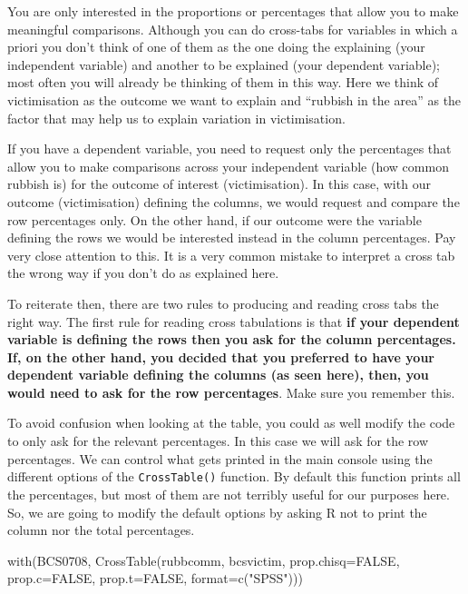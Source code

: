 \documentclass[
]{book}
\newenvironment{Shaded}{\begin{snugshade}}{\end{snugshade}}
\newcommand{\AttributeTok}[1]{\textcolor[rgb]{0.77,0.63,0.00}{#1}}
\newcommand{\ConstantTok}[1]{\textcolor[rgb]{0.00,0.00,0.00}{#1}}
\newcommand{\FunctionTok}[1]{\textcolor[rgb]{0.00,0.00,0.00}{#1}}
\newcommand{\NormalTok}[1]{#1}
\newcommand{\StringTok}[1]{\textcolor[rgb]{0.31,0.60,0.02}{#1}}
\begin{document}
You are only interested in the proportions or percentages that allow you to make meaningful comparisons. Although you can do cross-tabs for variables in which a priori you don't think of one of them as the one doing the explaining (your independent variable) and another to be explained (your dependent variable); most often you will already be thinking of them in this way. Here we think of victimisation as the outcome we want to explain and ``rubbish in the area'' as the factor that may help us to explain variation in victimisation.

If you have a dependent variable, you need to request only the percentages that allow you to make comparisons across your independent variable (how common rubbish is) for the outcome of interest (victimisation). In this case, with our outcome (victimisation) defining the columns, we would request and compare the row percentages only. On the other hand, if our outcome were the variable defining the rows we would be interested instead in the column percentages. Pay very close attention to this. It is a very common mistake to interpret a cross tab the wrong way if you don't do as explained here.

To reiterate then, there are two rules to producing and reading cross tabs the right way. The first rule for reading cross tabulations is that \textbf{if your dependent variable is defining the rows then you ask for the column percentages. If, on the other hand, you decided that you preferred to have your dependent variable defining the columns (as seen here), then, you would need to ask for the row percentages}. Make sure you remember this.

To avoid confusion when looking at the table, you could as well modify the code to only ask for the relevant percentages. In this case we will ask for the row percentages. We can control what gets printed in the main console using the different options of the \texttt{CrossTable()} function. By default this function prints all the percentages, but most of them are not terribly useful for our purposes here. So, we are going to modify the default options by asking R not to print the column nor the total percentages.

\begin{Shaded}
\begin{Highlighting}[]
\FunctionTok{with}\NormalTok{(BCS0708, }\FunctionTok{CrossTable}\NormalTok{(rubbcomm, bcsvictim, }\AttributeTok{prop.chisq=}\ConstantTok{FALSE}\NormalTok{, }\AttributeTok{prop.c=}\ConstantTok{FALSE}\NormalTok{, }\AttributeTok{prop.t=}\ConstantTok{FALSE}\NormalTok{, }\AttributeTok{format=}\FunctionTok{c}\NormalTok{(}\StringTok{"SPSS"}\NormalTok{)))}
\end{Highlighting}
\end{Shaded}
\end{document}
